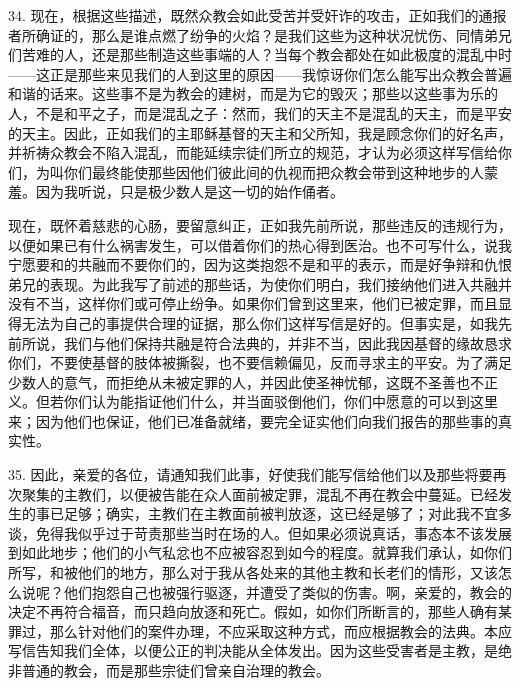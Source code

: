 34. 现在，根据这些描述，既然众教会如此受苦并受奸诈的攻击，正如我们的通报者所确证的，那么是谁点燃了纷争的火焰？是我们这些为这种状况忧伤、同情弟兄们苦难的人，还是那些制造这些事端的人？当每个教会都处在如此极度的混乱中时——这正是那些来见我们的人到这里的原因——我惊讶你们怎么能写出众教会普遍和谐的话来。这些事不是为教会的建树，而是为它的毁灭；那些以这些事为乐的人，不是和平之子，而是混乱之子：然而，我们的天主不是混乱的天主，而是平安的天主。因此，正如我们的主耶稣基督的天主和父所知，我是顾念你们的好名声，并祈祷众教会不陷入混乱，而能延续宗徒们所立的规范，才认为必须这样写信给你们，为叫你们最终能使那些因他们彼此间的仇视而把众教会带到这种地步的人蒙羞。因为我听说，只是极少数人是这一切的始作俑者。\par

现在，既怀着慈悲的心肠，要留意纠正，正如我先前所说，那些违反的违规行为，以便如果已有什么祸害发生，可以借着你们的热心得到医治。也不可写什么，说我宁愿要和的共融而不要你们的，因为这类抱怨不是和平的表示，而是好争辩和仇恨弟兄的表现。为此我写了前述的那些话，为使你们明白，我们接纳他们进入共融并没有不当，这样你们或可停止纷争。如果你们曾到这里来，他们已被定罪，而且显得无法为自己的事提供合理的证据，那么你们这样写信是好的。但事实是，如我先前所说，我们与他们保持共融是符合法典的，并非不当，因此我因基督的缘故恳求你们，不要使基督的肢体被撕裂，也不要信赖偏见，反而寻求主的平安。为了满足少数人的意气，而拒绝从未被定罪的人，并因此使圣神忧郁，这既不圣善也不正义。但若你们认为能指证他们什么，并当面驳倒他们，你们中愿意的可以到这里来；因为他们也保证，他们已准备就绪，要完全证实他们向我们报告的那些事的真实性。\par

35. 因此，亲爱的各位，请通知我们此事，好使我们能写信给他们以及那些将要再次聚集的主教们，以便被告能在众人面前被定罪，混乱不再在教会中蔓延。已经发生的事已足够；确实，主教们在主教面前被判放逐，这已经是够了；对此我不宜多谈，免得我似乎过于苛责那些当时在场的人。但如果必须说真话，事态本不该发展到如此地步；他们的小气私忿也不应被容忍到如今的程度。就算我们承认，如你们所写，和被他们的地方，那么对于我从各处来的其他主教和长老们的情形，又该怎么说呢？他们抱怨自己也被强行驱逐，并遭受了类似的伤害。啊，亲爱的，教会的决定不再符合福音，而只趋向放逐和死亡。假如，如你们所断言的，那些人确有某罪过，那么针对他们的案件办理，不应采取这种方式，而应根据教会的法典。本应写信告知我们全体，以便公正的判决能从全体发出。因为这些受害者是主教，是绝非普通的教会，而是那些宗徒们曾亲自治理的教会。\par

